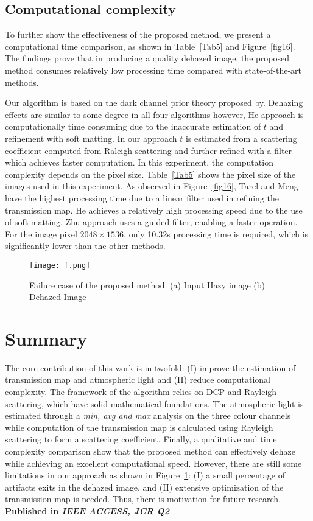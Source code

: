 \documentclass[doctor,english,listoffigures,listoftables]{thesis-uestc}
\begin{document}
\subsection{ Computational complexity}
To further show the effectiveness of the proposed method, we present a computational time comparison, as shown in Table~\ref{Tab5} and Figure~\ref{fig16}. The findings prove that in producing a quality dehazed image, the proposed method consumes relatively low processing time compared with state-of-the-art methods. 

Our algorithm is based on the dark channel prior theory proposed by\cite{a33}. Dehazing effects are similar to some degree in all four algorithms however, He approach is computationally time consuming due to the inaccurate estimation of $t$ and refinement with soft matting. In our approach $t$ is estimated from a scattering coefficient computed from Raleigh scattering and further refined with a filter which achieves faster computation. In this experiment, the computation complexity depends on the pixel size. Table~\ref{Tab5} shows the pixel size of the images used in this experiment. As observed in Figure~\ref{fig16}, Tarel and Meng have the highest processing time due to a linear filter used in refining the transmission map. He achieves a relatively high processing speed due to the use of soft matting. Zhu approach uses a guided filter, enabling a faster operation. For the image pixel $2048 \times 1536$, only 10.32s processing time is required, which is significantly lower than the other methods.
\begin{figure}[H]
	\centering
	\texttt{[image: f.png]}
	\caption{Failure case of the proposed method. (a) Input Hazy image (b) Dehazed Image}
	\label{f}
\end{figure}

\section{Summary} \label{con}
The core contribution of this work is in twofold: (I) improve the estimation of transmission map and atmospheric light and (II) reduce computational complexity. The framework of the algorithm relies on DCP and Rayleigh scattering, which have solid mathematical foundations. The atmospheric light is estimated through a \textit{min, avg and max} analysis on the three colour channels while computation of the transmission map is calculated using Rayleigh scattering to form a scattering coefficient.  Finally, a qualitative and time complexity comparison show that the proposed method can effectively dehaze while achieving an excellent computational speed. However, there are still some limitations in our approach as shown in Figure~\ref{f}: (I) a small percentage of artifacts exits in the dehazed image, and (II) extensive optimization of the transmission map is needed. Thus, there is motivation for future research. \textbf{Published in \emph{IEEE ACCESS, JCR Q2 }}
\end{document}

